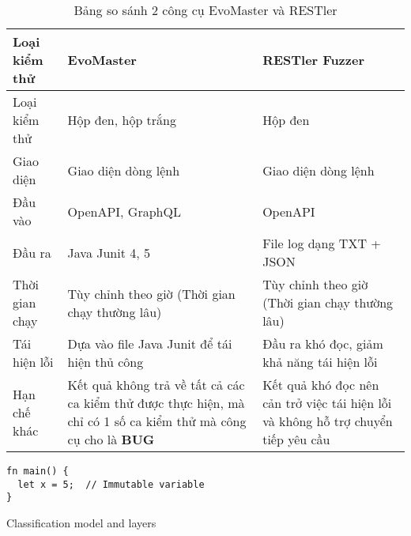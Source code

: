 \begin{table}[h]
\caption{Bảng so sánh 2 công cụ EvoMaster và RESTler}
\label{table:compare2tool}
\begin{tabularx}{\textwidth}{|l|X|X|}
\hline
\textbf{Loại kiểm thử} & \textbf{EvoMaster} & \textbf{RESTler Fuzzer} \\
\hline
Loại kiểm thử & Hộp đen, hộp trắng & Hộp đen \\
\hline
Giao diện & Giao diện dòng lệnh & Giao diện dòng lệnh \\
\hline
Đầu vào & OpenAPI, GraphQL & OpenAPI \\
\hline
Đầu ra & Java Junit 4, 5 & File log dạng TXT + JSON \\
\hline
Thời gian chạy & Tùy chỉnh theo giờ
(Thời gian chạy thường lâu) & Tùy chỉnh theo giờ (Thời gian chạy thường lâu) \\
\hline
Tái hiện lỗi & Dựa vào file Java Junit để tái hiện thủ công & Đầu ra khó đọc, giảm khả năng tái hiện lỗi \\
\hline
Hạn chế khác & Kết quả không trả về tất cả các ca kiểm thử được thực hiện, mà chỉ có 1 số ca kiểm thử mà công cụ cho là \textbf{BUG} & Kết quả khó đọc nên cản trở việc tái hiện lỗi và không hỗ trợ chuyển tiếp yêu cầu \\
\hline
\end{tabularx}
\end{table}



\begin{listing}[H]
\begin{verbatim}
fn main() {
  let x = 5;  // Immutable variable
}
\end{verbatim}
\caption{Classification model and layers}
\label{fp:immutable}
\end{listing}